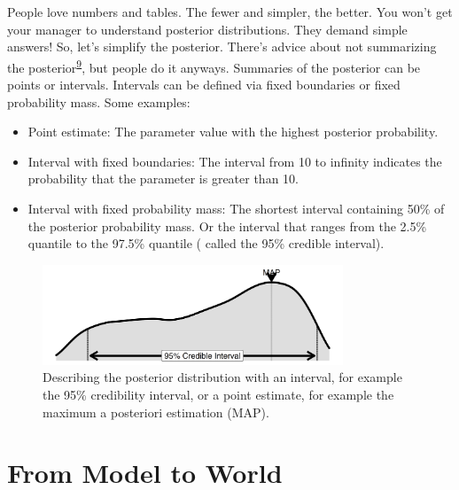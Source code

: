\documentclass[
  10pt,
]{scrbook}
\providecommand{\tightlist}{%
  \setlength{\itemsep}{0pt}\setlength{\parskip}{0pt}}
\begin{document}
People love numbers and tables.
The fewer and simpler, the better.
You won't get your manager to understand posterior distributions.
They demand simple answers!
So, let's simplify the posterior.
There's advice about not summarizing the posterior\textsuperscript{\protect\hyperlink{ref-tiao1973some}{9}}, but people do it anyways.
Summaries of the posterior can be points or intervals.
Intervals can be defined via fixed boundaries or fixed probability mass.
Some examples:

\begin{itemize}
\tightlist
\item
  Point estimate: The parameter value with the highest posterior probability.
\item
  Interval with fixed boundaries: The interval from 10 to infinity indicates the probability that the parameter is greater than 10.
\item
  Interval with fixed probability mass: The shortest interval containing 50\% of the posterior probability mass. Or the interval that ranges from the 2.5\% quantile to the 97.5\% quantile ( called the 95\% credible interval).
\end{itemize}

\begin{figure}

{\centering \includegraphics[width=0.8\textwidth]{figures/posterior-1} 

}

\caption{Describing the posterior distribution with an interval, for example the 95\% credibility interval, or a point estimate, for example the maximum a posteriori estimation (MAP).}\label{fig:posterior}
\end{figure}

\hypertarget{from-model-to-world}{%
\section{From Model to World}\label{from-model-to-world}}
\end{document}
